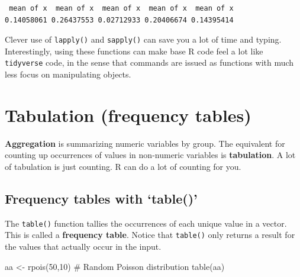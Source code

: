 \documentclass[
  13,
  letterpaper,
]{report}
\newenvironment{Shaded}{\begin{snugshade}}{\end{snugshade}}
\newcommand{\CommentTok}[1]{\textcolor[rgb]{0.37,0.37,0.37}{#1}}
\newcommand{\ControlFlowTok}[1]{\textcolor[rgb]{0.00,0.23,0.31}{\textbf{#1}}}
\newcommand{\DecValTok}[1]{\textcolor[rgb]{0.68,0.00,0.00}{#1}}
\newcommand{\FunctionTok}[1]{\textcolor[rgb]{0.28,0.35,0.67}{#1}}
\newcommand{\NormalTok}[1]{\textcolor[rgb]{0.00,0.23,0.31}{#1}}
\newcommand{\OtherTok}[1]{\textcolor[rgb]{0.00,0.23,0.31}{#1}}
\newcommand{\SpecialCharTok}[1]{\textcolor[rgb]{0.37,0.37,0.37}{#1}}
\begin{document}
\begin{Shaded}
\end{Shaded}

\begin{verbatim}
 mean of x  mean of x  mean of x  mean of x  mean of x 
0.14058061 0.26437553 0.02712933 0.20406674 0.14395414 
\end{verbatim}

Clever use of \texttt{lapply()} and \texttt{sapply()} can save you a lot
of time and typing. Interestingly, using these functions can make base R
code feel a lot like \texttt{tidyverse} code, in the sense that commands
are issued as functions with much less focus on manipulating objects.

\section{Tabulation (frequency tables)}\label{sec-summ-tab}

\textbf{Aggregation} is summarizing numeric variables by group. The
equivalent for counting up occurrences of values in non-numeric
variables is \textbf{tabulation}. A lot of tabulation is just counting.
R can do a lot of counting for you.

\subsection{Frequency tables with
`table()'}\label{frequency-tables-with-table}

The \texttt{table()} function tallies the occurrences of each unique
value in a vector. This is called a \textbf{frequency table}. Notice
that \texttt{table()} only returns a result for the values that actually
occur in the input.

\begin{Shaded}
\begin{Highlighting}[]
\NormalTok{aa }\OtherTok{\textless{}{-}} \FunctionTok{rpois}\NormalTok{(}\DecValTok{50}\NormalTok{,}\DecValTok{10}\NormalTok{)  }\CommentTok{\# Random Poisson distribution}
\FunctionTok{table}\NormalTok{(aa)}
\end{Highlighting}
\end{Shaded}
\end{document}
